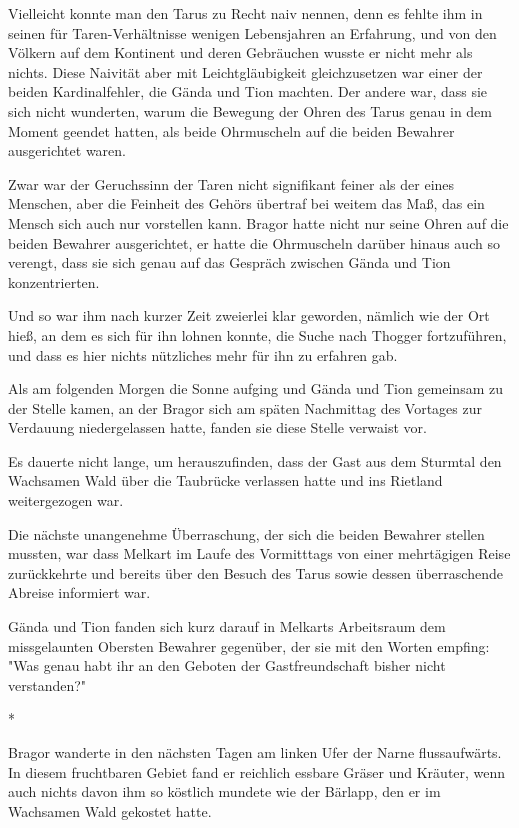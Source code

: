 \documentclass[10pt, a4paper, oneside]{book}
\begin{document}
\begin{multicols}{2}
Vielleicht konnte man den Tarus zu Recht naiv nennen, denn es fehlte ihm in seinen für Taren-Verhältnisse wenigen Lebensjahren an Erfahrung, und von den Völkern auf dem Kontinent und deren Gebräuchen wusste er nicht mehr als nichts. Diese Naivität aber mit Leichtgläubigkeit gleichzusetzen war einer der beiden Kardinalfehler, die Gända und Tion machten. Der andere war, dass sie sich nicht wunderten, warum die Bewegung der Ohren des Tarus genau in dem Moment geendet hatten, als beide Ohrmuscheln auf die beiden Bewahrer ausgerichtet waren. 

Zwar war der Geruchssinn der Taren nicht signifikant feiner als der eines Menschen, aber die Feinheit des Gehörs übertraf bei weitem das Maß, das ein Mensch sich auch nur vorstellen kann. Bragor hatte nicht nur seine Ohren auf die beiden Bewahrer ausgerichtet, er hatte die Ohrmuscheln darüber hinaus auch so verengt, dass sie sich genau auf das Gespräch zwischen Gända und Tion konzentrierten. 

Und so war ihm nach kurzer Zeit zweierlei klar geworden, nämlich wie der Ort hieß, an dem es sich für ihn lohnen konnte, die Suche nach Thogger fortzuführen, und dass es hier nichts nützliches mehr für ihn zu erfahren gab. 

Als am folgenden Morgen die Sonne aufging und Gända und Tion gemeinsam zu der Stelle kamen, an der Bragor sich am späten Nachmittag des Vortages zur Verdauung niedergelassen hatte, fanden sie diese Stelle verwaist vor. 

Es dauerte nicht lange, um herauszufinden, dass der Gast aus dem Sturmtal den Wachsamen Wald über die Taubrücke verlassen hatte und ins Rietland weitergezogen war. 

Die nächste unangenehme Überraschung, der sich die beiden Bewahrer stellen mussten, war dass Melkart im Laufe des Vormitttags von einer mehrtägigen Reise zurückkehrte und bereits über den Besuch des Tarus sowie dessen überraschende Abreise informiert war. 

Gända und Tion fanden sich kurz darauf in Melkarts Arbeitsraum dem missgelaunten Obersten Bewahrer gegenüber, der sie mit den Worten empfing: "Was genau habt ihr an den Geboten der Gastfreundschaft bisher nicht verstanden?" 

\begin{center}
    *
\end{center}

Bragor wanderte in den nächsten Tagen am linken Ufer der Narne flussaufwärts. In diesem fruchtbaren Gebiet fand er reichlich essbare Gräser und Kräuter, wenn auch nichts davon ihm so köstlich mundete wie der Bärlapp, den er im Wachsamen Wald gekostet hatte. 


\end{multicols}
\end{document}
